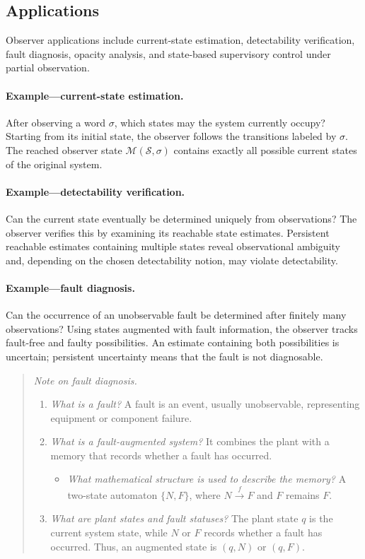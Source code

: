 \documentclass[11pt]{article}
\begin{document}
\subsection{Applications}

Observer applications include current-state estimation, detectability verification, fault diagnosis, opacity analysis, and state-based supervisory control under partial observation.

\paragraph{Example---current-state estimation.}
After observing a word $\sigma$, which states may the system currently occupy? Starting from its initial state, the observer follows the transitions labeled by $\sigma$. The reached observer state $\mathcal M(\mathcal S,\sigma)$ contains exactly all possible current states of the original system.

\paragraph{Example---detectability verification.}
Can the current state eventually be determined uniquely from observations? The observer verifies this by examining its reachable state estimates. Persistent reachable estimates containing multiple states reveal observational ambiguity and, depending on the chosen detectability notion, may violate detectability.

\paragraph{Example---fault diagnosis.}
Can the occurrence of an unobservable fault be determined after finitely many observations? Using states augmented with fault information, the observer tracks fault-free and faulty possibilities. An estimate containing both possibilities is uncertain; persistent uncertainty means that the fault is not diagnosable.

\begin{quote}
\textit{Note on fault diagnosis.}
\begin{enumerate}
\item \textit{What is a fault?} A fault is an event, usually unobservable, representing equipment or component failure.
\item \textit{What is a fault-augmented system?} It combines the plant with a memory that records whether a fault has occurred.
\begin{itemize}
\item \textit{What mathematical structure is used to describe the memory?} A two-state automaton $\{N,F\}$, where $N\xrightarrow{f}F$ and $F$ remains $F$.
\end{itemize}
\item \textit{What are plant states and fault statuses?} The plant state $q$ is the current system state, while $N$ or $F$ records whether a fault has occurred. Thus, an augmented state is $(q,N)$ or $(q,F)$.
\end{enumerate}
\end{quote}
\end{document}
